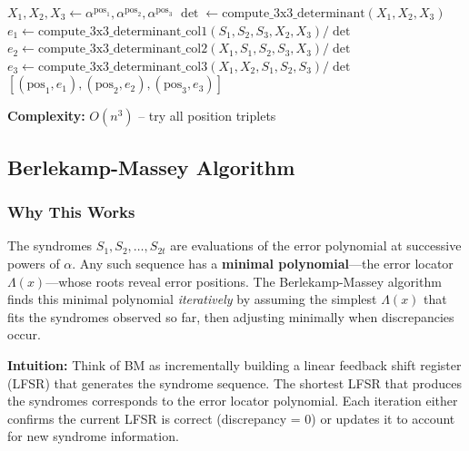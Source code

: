 \documentclass[11pt,a4paper]{article}
\begin{document}
\begin{algorithm}[H]
\caption{Brute-Force 3-Error Decoder}
\begin{algorithmic}[1]
            \State $X_1, X_2, X_3 \gets \alpha^{\text{pos}_1}, \alpha^{\text{pos}_2}, \alpha^{\text{pos}_3}$
            \State $\det \gets \text{compute\_3x3\_determinant}(X_1, X_2, X_3)$
                \State $e_1 \gets \text{compute\_3x3\_determinant\_col1}(S_1,S_2,S_3, X_2,X_3) / \det$
                \State $e_2 \gets \text{compute\_3x3\_determinant\_col2}(X_1, S_1,S_2,S_3, X_3) / \det$
                \State $e_3 \gets \text{compute\_3x3\_determinant\_col3}(X_1,X_2, S_1,S_2,S_3) / \det$
                    \State \Return $[(\text{pos}_1,e_1), (\text{pos}_2,e_2), (\text{pos}_3,e_3)]$
                \EndIf
            \EndIf
        \EndFor
    \EndFor
\EndFor
\end{algorithmic}
\end{algorithm}

\textbf{Complexity:} $O(n^3)$ -- try all position triplets

\subsection{Berlekamp-Massey Algorithm}

\subsubsection{Why This Works}

The syndromes $S_1, S_2, \ldots, S_{2t}$ are evaluations of the error polynomial at successive powers of $\alpha$. Any such sequence has a \textbf{minimal polynomial}---the error locator $\Lambda(x)$---whose roots reveal error positions. The Berlekamp-Massey algorithm finds this minimal polynomial \textit{iteratively} by assuming the simplest $\Lambda(x)$ that fits the syndromes observed so far, then adjusting minimally when discrepancies occur.

\textbf{Intuition:} Think of BM as incrementally building a linear feedback shift register (LFSR) that generates the syndrome sequence. The shortest LFSR that produces the syndromes corresponds to the error locator polynomial. Each iteration either confirms the current LFSR is correct (discrepancy = 0) or updates it to account for new syndrome information.
\end{document}
